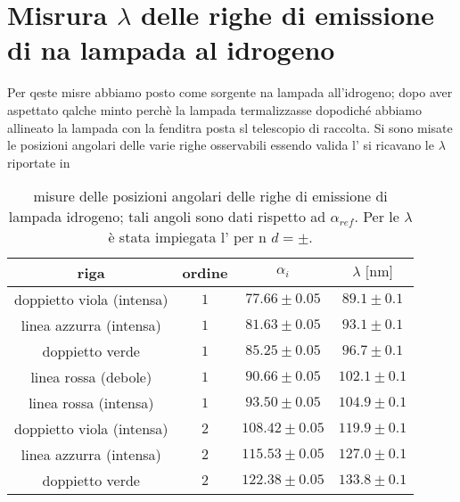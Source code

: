 \section{Misrura $\lambda$ delle righe di emissione di na lampada al
	idrogeno}
	Per qeste misre abbiamo posto come sorgente na lampada all'idrogeno;
	dopo aver aspettato qalche minto perchè la lampada termalizzasse 
	dopodiché abbiamo allineato la lampada con la fenditra 
	posta sl telescopio di raccolta.
	Si sono misate le posizioni angolari delle varie righe osservabili
	essendo valida l'
	si ricavano le $\lambda$  riportate in 
	\smallskip
	\begin{table}[hb]
	\centering
		\begin{tabular}{|c|c|c|c|}
		\hline
		riga & ordine & $\alpha _{i}$ & $\lambda \text{ [nm]}$ \\
		\hline
		doppietto viola (intensa) & $ 1 $ &$77.66 \pm 0.05 $ & $89.1 \pm 0.1$\\
		\hline
		linea azzurra (intensa) & $ 1$ & $81.63 \pm 0.05 $ &$93.1 \pm 0.1$\\
		\hline
		doppietto verde & $ 1$ & $85.25 \pm 0.05 $ &$96.7 \pm 0.1$\\
		\hline
		linea rossa (debole) &$ 1$ & $90.66 \pm 0.05 $&$102.1 \pm 0.1$ \\
		\hline
		linea rossa (intensa) &$1$ & $93.50 \pm 0.05$ &$104.9 \pm 0.1$\\
		\hline
		doppietto viola (intensa) & $ 2$ & $ 108.42 \pm 0.05 $ &$119.9 \pm 0.1$\\
		\hline
		linea azzurra (intensa) & $ 2 $ & $115.53 \pm 0.05 $ &$127.0 \pm 0.1$\\
		\hline
		doppietto verde & $ 2$ & $122.38 \pm 0.05 $&$133.8 \pm 0.1$ \\
		\hline
		\end{tabular}
		\caption{misure delle posizioni angolari delle righe di emissione di lampada idrogeno; tali angoli sono dati rispetto ad $\alpha_{ref}$.
		Per le $\lambda$ è stata impiegata l' per n $d= 	\pm		$.}
		\label{tab:hydrogen}
	\end{table}
	\smallskip
